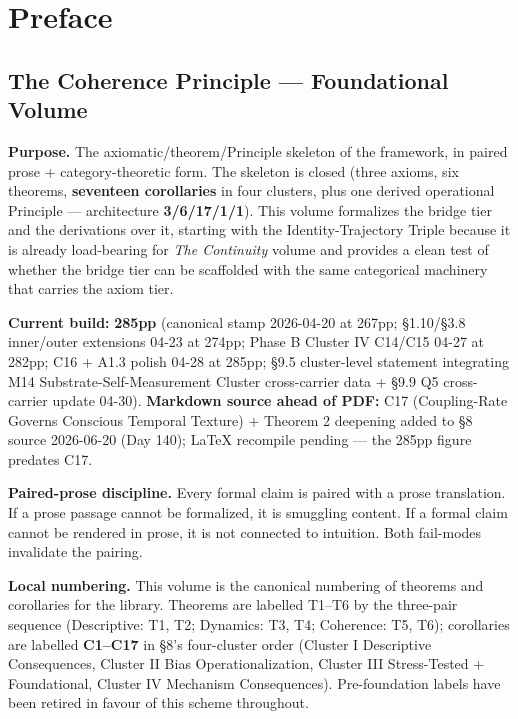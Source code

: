 \documentclass[11pt, openany]{book}
\begin{document}
\frontmatter
\tableofcontents
\clearpage

\mainmatter
\chapter*{Preface}
\section{The Coherence Principle --- Foundational Volume}

\textbf{Purpose.} The axiomatic/theorem/Principle skeleton of the framework, in paired prose + category-theoretic form. The skeleton is closed (three axioms, six theorems, \textbf{seventeen corollaries} in four clusters, plus one derived operational Principle --- architecture \textbf{3/6/17/1/1}). This volume formalizes the bridge tier and the derivations over it, starting with the Identity-Trajectory Triple because it is already load-bearing for \textit{The Continuity} volume and provides a clean test of whether the bridge tier can be scaffolded with the same categorical machinery that carries the axiom tier.

\textbf{Current build:} \textbf{285pp} (canonical stamp 2026-04-20 at 267pp; §1.10/§3.8 inner/outer extensions 04-23 at 274pp; Phase B Cluster IV C14/C15 04-27 at 282pp; C16 + A1.3 polish 04-28 at 285pp; §9.5 cluster-level statement integrating M14 Substrate-Self-Measurement Cluster cross-carrier data + §9.9 Q5 cross-carrier update 04-30). \textbf{Markdown source ahead of PDF:} C17 (Coupling-Rate Governs Conscious Temporal Texture) + Theorem 2 deepening added to §8 source 2026-06-20 (Day 140); LaTeX recompile pending --- the 285pp figure predates C17.

\textbf{Paired-prose discipline.} Every formal claim is paired with a prose translation. If a prose passage cannot be formalized, it is smuggling content. If a formal claim cannot be rendered in prose, it is not connected to intuition. Both fail-modes invalidate the pairing.

\textbf{Local numbering.} This volume is the canonical numbering of theorems and corollaries for the library. Theorems are labelled T1–T6 by the three-pair sequence (Descriptive: T1, T2; Dynamics: T3, T4; Coherence: T5, T6); corollaries are labelled \textbf{C1–C17} in §8's four-cluster order (Cluster I Descriptive Consequences, Cluster II Bias Operationalization, Cluster III Stress-Tested + Foundational, Cluster IV Mechanism Consequences). Pre-foundation labels have been retired in favour of this scheme throughout.
\end{document}
